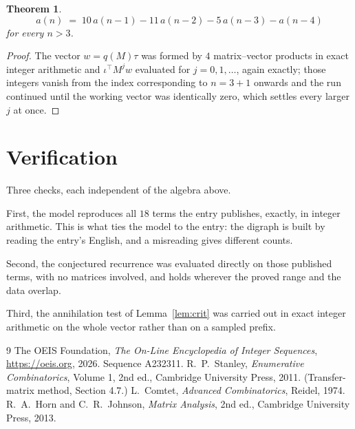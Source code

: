 \documentclass[11pt,a4paper]{article}
\theoremstyle{plain}
\newtheorem{theorem}{Theorem}
\theoremstyle{definition}
\begin{document}
\begin{theorem}
\[
a(n)\;=\;10\,a(n-1) - 11\,a(n-2) - 5\,a(n-3) - a(n-4)
\]
for every $n>3$.
\end{theorem}

\begin{proof}
The vector $w=q(M)\tau$ was formed by $4$ matrix--vector products in exact integer
arithmetic and $\iota^{\!\top}M^{j}w$ evaluated for $j=0,1,\dots$, again exactly; those
integers vanish from the index corresponding to $n=3+1$ onwards and the run continued
until the working vector was identically zero, which settles every larger $j$ at once.
\end{proof}

\section{Verification}

Three checks, each independent of the algebra above.

First, the model reproduces all $18$ terms the entry publishes, exactly, in integer
arithmetic. This is what ties the model to the entry: the digraph is built by reading the
entry's English, and a misreading gives different counts.

Second, the conjectured recurrence was evaluated directly on those published terms, with no
matrices involved, and holds wherever the proved range and the data overlap.

Third, the annihilation test of Lemma~\ref{lem:crit} was carried out in exact integer
arithmetic on the whole vector rather than on a sampled prefix.

\begin{thebibliography}{9}
 The OEIS Foundation, \emph{The On-Line Encyclopedia of Integer
Sequences}, \url{https://oeis.org}, 2026. Sequence A232311.
 R.~P.~Stanley, \emph{Enumerative Combinatorics}, Volume 1, 2nd ed.,
Cambridge University Press, 2011. (Transfer-matrix method, Section 4.7.)
 L.~Comtet, \emph{Advanced Combinatorics}, Reidel, 1974.
 R.~A.~Horn and C.~R.~Johnson, \emph{Matrix Analysis}, 2nd ed., Cambridge
University Press, 2013.
\end{thebibliography}
\end{document}
